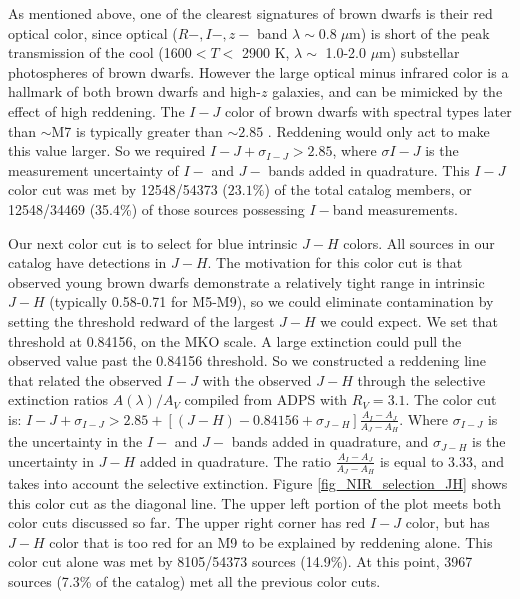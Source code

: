 \documentclass[12pt,preprint]{aastex}
\begin{document}
As mentioned above, one of the clearest signatures of brown dwarfs is their red optical color, since optical  ($R-,I-, z-$ band $\lambda \sim  0.8 \; \mu$m) is short of the peak transmission of the cool (1600$< T <$ 2900 K, $\lambda \sim$ 1.0-2.0 $\mu$m) substellar photospheres of brown dwarfs.  However the large optical minus infrared color is a hallmark of both brown dwarfs and high-$z$ galaxies, and can be mimicked by the effect of high reddening.  The $I-J$ color of brown dwarfs with spectral types later than $\sim$M7 is typically greater than $\sim2.85$ \cite{allers06}.  Reddening would only act to make this value larger.  So we required $I-J +\sigma_{I-J} > 2.85$, where $\sigma{I-J}$ is the measurement uncertainty of $I-$ and $J-$ bands added in quadrature.  This $I-J$ color cut was met by 12548/54373 ($23.1\%$) of the total catalog members, or 12548/34469 (35.4\%) of those sources possessing $I-$band measurements. 

Our next color cut is to select for blue intrinsic $J-H$ colors.  All sources in our catalog have detections in $J-H$. The motivation for this color cut is that observed young brown dwarfs demonstrate a relatively tight range in intrinsic $J-H$ (typically 0.58-0.71 for M5-M9), so we could eliminate contamination by setting the threshold redward of the largest $J-H$ we could expect.  We set that threshold at 0.84156, on the MKO scale.  A large extinction could pull the observed value past the 0.84156 threshold.  So we constructed a reddening line that related the observed $I-J$ with the observed $J-H$ through the selective extinction ratios $A(\lambda)/A_V$ compiled from ADPS \citep{2000A&AS..147..361M} with $R_V=3.1$.  The color cut is: $I-J + \sigma_{I-J} > 2.85 + [(J-H) - 0.84156 + \sigma_{J-H}]\frac{A_I-A_J}{A_J - A_H}$.  Where $\sigma_{I-J}$ is the uncertainty in the $I-$ and $J-$ bands added in quadrature, and $\sigma_{J-H}$ is the uncertainty in $J-H$ added in quadrature.  The ratio $\frac{A_I-A_J}{A_J - A_H}$ is equal to 3.33, and takes into account the selective extinction.  Figure \ref{fig_NIR_selection_JH} shows this color cut as the diagonal line.  The upper left portion of the plot meets both color cuts discussed so far.  The upper right corner has red $I-J$ color, but has $J-H$ color that is too red for an M9 to be explained by reddening alone.  This color cut alone was met by 8105/54373 sources (14.9\%).  At this point, 3967 sources (7.3\% of the catalog) met all the previous color cuts.
\end{document}
